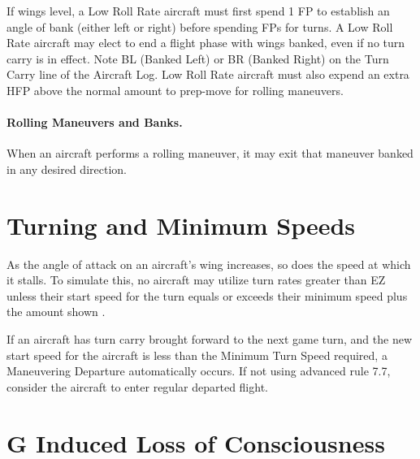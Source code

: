 \begin{advancedrules}
If wings level, a Low Roll Rate aircraft must first spend 1 FP to establish an angle of bank (either left or right) before spending FPs for turns. A Low Roll Rate aircraft may elect to end a flight phase with wings banked, even if no turn carry is in effect. Note BL (Banked Left) or BR (Banked Right) on the Turn Carry line of the Aircraft Log.  Low Roll Rate aircraft must also expend an extra HFP above the normal amount to prep-move for rolling maneuvers.


\paragraph{Rolling Maneuvers and Banks.} 
When an aircraft performs a rolling maneuver, it may exit that maneuver banked in any desired direction.

\section{Turning and Minimum Speeds}
\label{rule:turning-and-minimum-speeds}

As the angle of attack on an aircraft's wing increases, so does the speed at which it stalls. To simulate this, no aircraft may utilize turn rates greater than EZ unless their start speed for the turn equals or exceeds their minimum speed plus the amount shown .



If an aircraft has turn carry brought forward to the next game turn, and the new start speed for the aircraft is less than the Minimum Turn Speed required, a Maneuvering Departure automatically occurs. If not using advanced rule 7.7, consider the aircraft to enter regular departed flight.

\section{G Induced Loss of Consciousness}
\label{rule:gloc}


\end{advancedrules}
